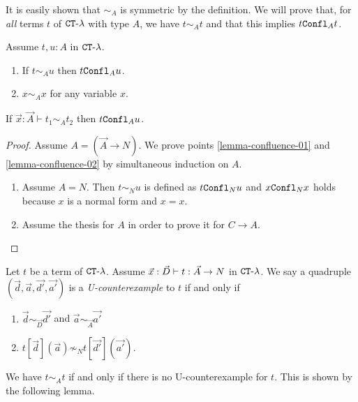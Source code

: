 It is easily shown that $\sim_A$ is symmetric by the definition. We will prove that, for \emph{all} terms $t$ of ${ {\tt CT}\mbox{-}\lambda}$ with type $A$, we have $t \sim_A t$ and that this implies $t {\tt Confl}_A t$.


\begin{lemma}
\label{lemma-confluence}
Assume $t,u:A$ in ${ {\tt CT}\mbox{-}\lambda}$.
\begin{enumerate}
\item
\label{lemma-confluence-01}
If $t \sim_A u$ then $t {\tt Confl}_A u$.
\item
\label{lemma-confluence-02}
$x \sim_A x$ for any variable $x$.
\end{enumerate}
If $\vec{x}:\vec{A} \vdash  t_1 \sim_{A} t_2$ then $t {\tt Confl}_A u$.
\end{lemma}

\begin{proof}
Assume $A = (\vec{A} \rightarrow N)$. 
We prove points \ref{lemma-confluence-01} and \ref{lemma-confluence-02} by simultaneous induction on $A$.
\begin{enumerate}
\item
Assume $A=N$. Then $t \sim_N u$ is defined as $t {\tt Confl}_N u$ and $x {\tt Confl}_N x$ holds because $x$ is a normal form and $x = x$.
\item
Assume the thesis for $A$ in order to prove it for $C \rightarrow A$.

\end{enumerate}

\end{proof}

\begin{definition}[U-counterexample]
  Let $t$ be a term of ${ {\tt CT}\mbox{-}\lambda}$. 
    Assume $\vec{x}:\vec{D}\vdash t:\vec{A}\rightarrow{N}$ in ${ {\tt CT}\mbox{-}\lambda}$. 
    We say a quadruple $(\vec{d},\vec{a},\vec{d'},\vec{a'})$ is a {\em U-counterexample} to $t$
    if and only if
    \begin{enumerate}
    \item
    $\vec{d}\sim_{\vec{D}}\vec{d'}$ and $\vec{a}\sim_{\vec{A}}\vec{a'}$
    \item
    $t[\vec{d}](\vec{a}) \not\sim_N t[\vec{d'}](\vec{a'})$. 
    \end{enumerate}
\end{definition}


We have $t \sim_A t$ if and only if there is no U-counterexample for $t$.
This is shown by the following lemma.

